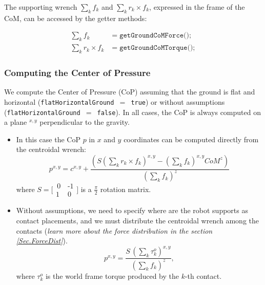 \documentclass[12pt]{article}
\begin{document}
The supporting wrench $\sum_k f_k$ and $\sum_k r_k\times f_k$, expressed in the frame of the CoM, can be accessed by the getter methods:

\begin{align}
    \sum_k f_k &=\texttt{getGroundCoMForce()}; \\
    \sum_k r_k\times f_k &= \texttt{getGroundCoMTorque()};
\end{align}

\subsubsection{Computing the Center of Pressure}

We compute the Center of Pressure (CoP) assuming that the ground is flat and horizontal (\texttt{flatHorizontalGround $=$ true}) or without assumptions (\texttt{flatHorizontalGround $=$ false}). In all cases, the CoP is always computed on a plane $^{x,y}$ perpendicular to the gravity.

\begin{itemize}
    \item[] In this case the CoP $p$ in $x$ and $y$ coordinates can be computed directly from the centroidal wrench:
    \begin{equation}
        p^{x,y} = c^{x,y} + \dfrac{\left( S (\sum_k r_k\times f_k)^{x, y} - (\sum_k f_k)^{x,y}CoM^{z} \right)}{(\sum_k f_k)^z}
    \end{equation}
    where $ S=\big[\begin{smallmatrix}\,0\, & \texttt{-}1\\1\, &0
\end{smallmatrix}\big]$ is a $\frac{\pi}{2}$ rotation matrix.

    \item[] Without assumptions, we need to specify where are the robot supports as contact placements, and we must distribute the centroidal wrench among the contacts ({\it learn more about the force distribution in the section \ref{Sec.ForceDist}}).
    \begin{equation}
        p^{x,y} = \dfrac{S\, (\sum_k {\tau^o_k})^{x,y}}{(\sum_k f_k)^z},
    \end{equation}
    where $\tau^o_k$ is the world frame torque produced by the $k$-th contact.

\end{itemize}
\end{document}
